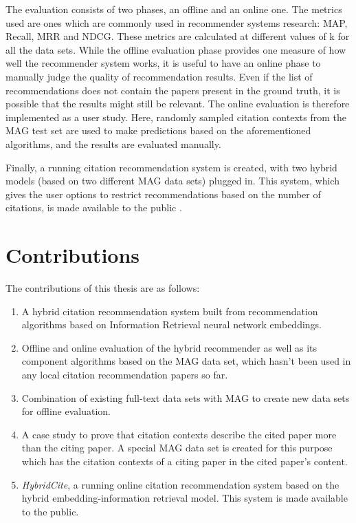 The evaluation consists of two phases, an offline and an online one. The metrics used are ones which are commonly used in recommender systems research: MAP, Recall, MRR and NDCG. These metrics are calculated at different values of k for all the data sets.
While the offline evaluation phase provides one measure of how well the recommender system works, it is useful to have an online phase to manually judge the quality of recommendation results. Even if the list of recommendations does not contain the papers present in the ground truth, it is possible that the results might still be relevant. The online evaluation is therefore implemented as a user study. Here, randomly sampled citation contexts from the MAG test set are used to make predictions based on the aforementioned algorithms, and the results are evaluated manually.

Finally, a running citation recommendation system is created, with two hybrid models (based on two different MAG data sets) plugged in. This system, which gives the user options to restrict recommendations based on the number of citations, is made available to the public .
\section{Contributions}\label{sec:contributions}
The contributions of this thesis are as follows:
\begin{enumerate}
    \item A hybrid citation recommendation system built from recommendation algorithms based on Information Retrieval neural network embeddings.
    \item Offline and online evaluation of the hybrid recommender as well as its component algorithms based on the MAG data set, which hasn't been used in any local citation recommendation papers so far.
    \item Combination of existing full-text data sets with MAG to create new data sets for offline evaluation.
    \item A case study to prove that citation contexts describe the cited paper more than the citing paper. A special MAG data set is created for this purpose which has the citation contexts of a citing paper in the cited paper's content.
    \item \textit{HybridCite}, a running online citation recommendation system based on the hybrid embedding-information retrieval model. This system is made available to the public.
\end{enumerate}

